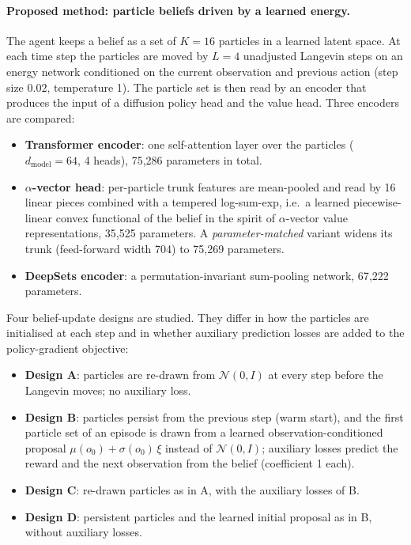 \documentclass[11pt]{article}
\begin{document}
\paragraph{Proposed method: particle beliefs driven by a learned energy.}
The agent keeps a belief as a set of $K = 16$ particles in a learned latent space. At each time step the particles are moved by $L = 4$ unadjusted Langevin steps on an energy network conditioned on the current observation and previous action (step size $0.02$, temperature 1). The particle set is then read by an encoder that produces the input of a diffusion policy head and the value head. Three encoders are compared:
\begin{itemize}
  \item \textbf{Transformer encoder}: one self-attention layer over the particles ($d_{\text{model}} = 64$, 4 heads), 75{,}286 parameters in total.
  \item \textbf{$\alpha$-vector head}: per-particle trunk features are mean-pooled and read by 16 linear pieces combined with a tempered log-sum-exp, i.e.\ a learned piecewise-linear convex functional of the belief in the spirit of $\alpha$-vector value representations, 35{,}525 parameters. A \emph{parameter-matched} variant widens its trunk (feed-forward width 704) to 75{,}269 parameters.
  \item \textbf{DeepSets encoder}: a permutation-invariant sum-pooling network, 67{,}222 parameters.
\end{itemize}
Four belief-update designs are studied. They differ in how the particles are initialised at each step and in whether auxiliary prediction losses are added to the policy-gradient objective:
\begin{itemize}
  \item \textbf{Design A}: particles are re-drawn from $\mathcal{N}(0, I)$ at every step before the Langevin moves; no auxiliary loss.
  \item \textbf{Design B}: particles persist from the previous step (warm start), and the first particle set of an episode is drawn from a learned observation-conditioned proposal $\mu(o_0) + \sigma(o_0)\,\xi$ instead of $\mathcal{N}(0, I)$; auxiliary losses predict the reward and the next observation from the belief (coefficient 1 each).
  \item \textbf{Design C}: re-drawn particles as in A, with the auxiliary losses of B.
  \item \textbf{Design D}: persistent particles and the learned initial proposal as in B, without auxiliary losses.
\end{itemize}
\end{document}
